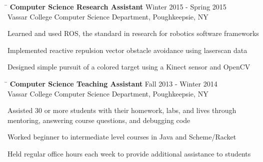 \documentclass{res}
\begin{document}
\begin{resume}
{    \vspace{-12pt}
    \begin{tabbing}
      \hspace{5in}\=  \kill %
      {\bf Computer Science Research Assistant}%
      \>Winter 2015 - Spring 2015\\
      Vassar College Computer Science Department, Poughkeepsie, NY\\     
    \end{tabbing}
    \vspace{-24pt}      %
    \begin{list}{-}{}
      \setlength{\itemsep}{-2pt}
      \item Learned and used ROS, the standard in research for
            robotics software frameworks
      \item Implemented reactive repulsion vector obstacle avoidance
            using laserscan data
      \item Designed simple pursuit of a colored target using a Kinect
            sensor and OpenCV
    \end{list}

    \vspace{-12pt}
    \begin{tabbing}
      \hspace{5in}\=  \kill %
      {\bf Computer Science Teaching Assistant}%
      \>Fall 2013 - Winter 2014\\
      Vassar College Computer Science Department, Poughkeepsie, NY\\     
    \end{tabbing}
    \vspace{-24pt}      %
    \begin{list}{-}{}
      \setlength{\itemsep}{-2pt}
      \item Assisted 30 or more students with their homework, labs,
            and lives through\\ mentoring, answering course questions,
            and debugging code
      \item Worked beginner to intermediate level courses in Java and
            Scheme/Racket
      \item Held regular office hours each week to provide additional
            assistance to students
    \end{list}

}
\end{resume}
\end{document}

